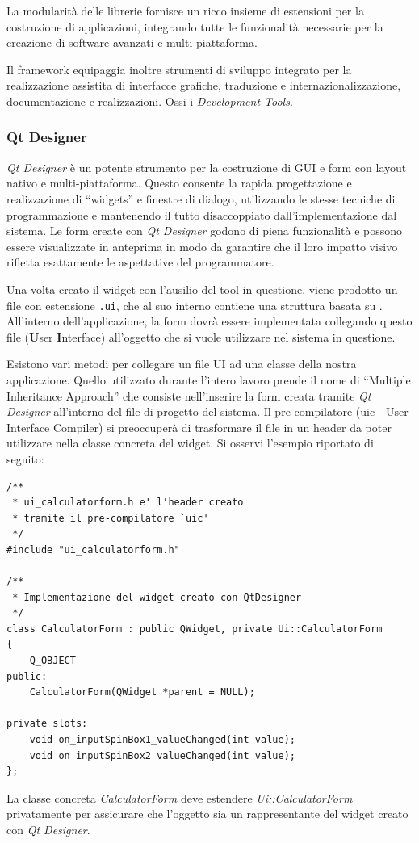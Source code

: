 La modularità delle librerie \qt{} fornisce un ricco insieme di estensioni per la costruzione di applicazioni, integrando tutte le funzionalità necessarie per la creazione di software avanzati e multi-piattaforma.

Il framework equipaggia inoltre strumenti di sviluppo integrato per la realizzazione assistita di interfacce grafiche, traduzione e internazionalizzazione, documentazione e realizzazioni. Ossi i \emph{Development Tools}.

\subsubsection{Qt Designer}
\emph{Qt Designer} è un potente strumento per la costruzione di GUI e form con layout nativo e multi-piattaforma. Questo consente la rapida progettazione e realizzazione di ``widgets'' e finestre di dialogo, utilizzando le stesse tecniche di programmazione e mantenendo il tutto disaccoppiato dall'implementazione dal sistema. Le form create con \emph{Qt Designer} godono di piena funzionalità e possono essere visualizzate in anteprima in modo da garantire che il loro impatto visivo rifletta esattamente le aspettative del programmatore.

Una volta creato il widget con l'ausilio del tool in questione, viene prodotto un file con estensione \texttt{.ui}, che al suo interno contiene una struttura basata su \xml{}. All'interno dell'applicazione, la form dovrà essere implementata collegando questo file (\textbf{U}ser \textbf{I}nterface) all'oggetto che si vuole utilizzare nel sistema in questione.

Esistono vari metodi per collegare un file UI ad una classe della nostra applicazione. Quello utilizzato durante l'intero lavoro prende il nome di ``Multiple Inheritance Approach'' che consiste nell'inserire la form creata tramite \emph{Qt Designer} all'interno del file di progetto del sistema. Il pre-compilatore (uic - User Interface Compiler) si preoccuperà di trasformare il file \xml{} in un header \cpp{} da poter utilizzare nella classe concreta del widget. Si osservi l'esempio riportato di seguito:
\begin{lstlisting}
/**
 * ui_calculatorform.h e' l'header creato
 * tramite il pre-compilatore `uic'
 */
#include "ui_calculatorform.h"

/**
 * Implementazione del widget creato con QtDesigner
 */
class CalculatorForm : public QWidget, private Ui::CalculatorForm
{
    Q_OBJECT
public:
    CalculatorForm(QWidget *parent = NULL);

private slots:
    void on_inputSpinBox1_valueChanged(int value);
    void on_inputSpinBox2_valueChanged(int value);
};
\end{lstlisting}
La classe concreta \emph{CalculatorForm} deve estendere \emph{Ui::CalculatorForm} privatamente per assicurare che l'oggetto sia un rappresentante del widget creato con \emph{Qt Designer}.

